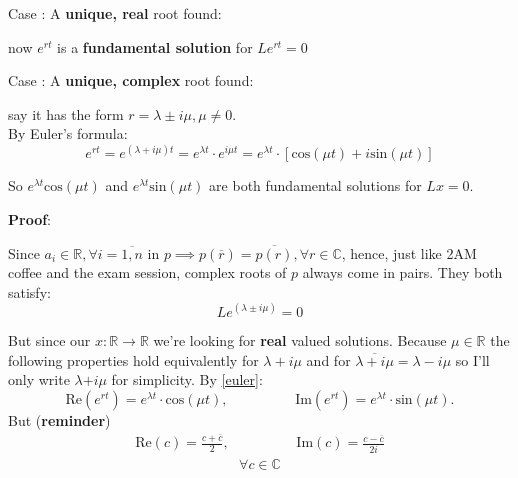 Case : A \textbf{unique, real} root found:

now $e^{rt}$ is a \textbf{fundamental solution} for $Le^{rt}=0$

Case : A \textbf{unique, complex} root found:

say it has the form $r = \lambda \pm i\mu, \mu \neq 0$. \\
By Euler's formula:
\begin{equation}\label{euler}
  e^{rt} = e^{(\lambda + i\mu)t} = e^{\lambda t} \cdot e^{i \mu t}  =  e^{\lambda t} \cdot [\text{cos}(\mu t) + i \text{sin}(\mu t)]
\end{equation}

So $e^{\lambda t}\text{cos}(\mu t)$ and $e^{\lambda t}\text{sin}(\mu t)$ are both fundamental solutions for $Lx=0$.

\textbf{Proof}: \par
Since $a_i \in \mathbb{R}, \forall i=\overline{1,n}$ in $p \implies p(\overline{r})=\overline{p(r)}, \forall r \in \mathbb{C}$, hence, just like 2AM coffee and the exam session, complex roots of $p$ always come in pairs. They both satisfy:
\begin{equation}\label{lin_op_solution}
  Le^{(\lambda \pm i \mu)} = 0
\end{equation}

But since our $x : \mathbb{R} \rightarrow \mathbb{R}$ we're looking for \textbf{real} valued solutions.
Because $\mu \in \mathbb{R}$ the following properties hold equivalently for $\lambda + i\mu$ and for $\overline{\lambda + i\mu}=\lambda - i\mu$ so I'll only write $\lambda \textbf{+} i \mu$ for simplicity.
By \ref{euler}:
\begin{equation}\label{eulers_real_and_imaginary}
  \text{Re}(e^{rt})=e^{\lambda t} \cdot \text{cos}(\mu t), \hspace{2cm}    \text{Im}(e^{rt}) = e^{\lambda t} \cdot \text{sin}(\mu t).
\end{equation}
But (\textbf{reminder})
\begin{gather}\label{real_imag_another_way_to_write}
  \text{Re}(c)= \frac{c+\overline{c}}{2}, \hspace{2cm}
  \text{Im}(c) = \frac{c-\overline{c}}{2i}
\end{gather}
\begin{gather*}
  \forall c \in \mathbb{C}
\end{gather*}

\newcommand\firstConclusion{\stackrel{\mathclap{\normalfont\mbox{\ref{eulers_real_and_imaginary}, \ref{real_imag_another_way_to_write}}}}{=\joinrel=\joinrel=\joinrel=\joinrel=\joinrel=}}

